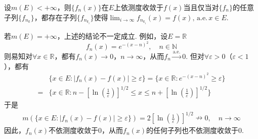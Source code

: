 \documentclass[../../main.tex]{subfiles}
\begin{document}
\begin{corollary}\label{corollary:Riesz定理推论}
设\(m(E) < +\infty\)，则$\{f_n(x)\}$在$E$上依测度收敛于$f(x)$当且仅当对\(\{f_n\}\)的任意子列\(\{f_{n_k}\}\)，都存在子列\(\{f_{n_{k_i}}\}\)使得$\lim_{i\to \infty}f_{n_{k_i}}(x)= f(x),\,\text{a.e.}\,x\in E.$
\end{corollary}
\begin{remark}
若\(m(E) = +\infty\)，上述的结论不一定成立. 例如，设\(E = \mathbb{R}\)
\[f_n(x) = e^{-(x - n)^2}, \quad n \in \mathbb{N}\]
则易知对\(\forall x \in \mathbb{R}\)，都有\(f_n(x) \to 0\)，\(n \to \infty\)，从而\(f_n \stackrel{\text{a.e.}}{\longrightarrow} 0\). 但对\(\forall \varepsilon > 0\)（\(\varepsilon < 1\)），都有
\begin{align*}
&\{x \in E : |f_n(x) - f(x)| \geqslant \varepsilon\} = \{x \in \mathbb{R} : e^{-(x - n)^2} \geqslant \varepsilon\} \\
=& \{x \in \mathbb{R} : n - \left[\ln \left(\frac{1}{\varepsilon}\right)\right]^{1/2} \leqslant x \leqslant n + \left[\ln \left(\frac{1}{\varepsilon}\right)\right]^{1/2}\}
\end{align*}
于是
\begin{align*}
m(\{x \in E : |f_n(x) - f(x)| \geqslant \varepsilon\}) = 2\left[\ln \left(\frac{1}{\varepsilon}\right)\right]^{1/2} \nrightarrow 0, \quad n \to \infty
\end{align*}
因此，\(f_n(x)\)不依测度收敛于\(0\)，从而\(f_n(x)\)的任何子列也不依测度收敛于\(0\). 
\end{remark}
\end{document}
